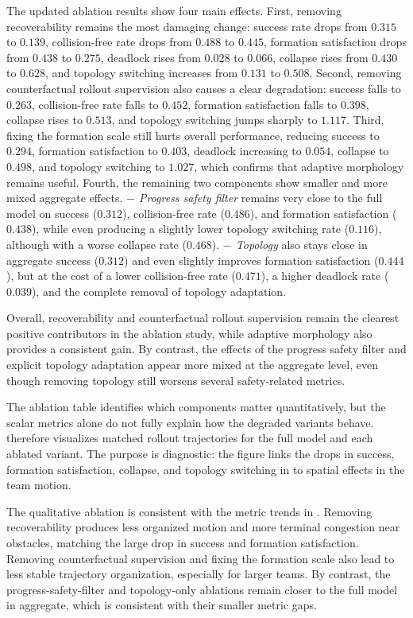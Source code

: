 \documentclass{ieeeaccess}
\begin{document}
The updated ablation results show four main effects. First, removing
recoverability remains the most damaging change: success rate drops from
$0.315$ to $0.139$, collision-free rate drops from $0.488$ to $0.445$,
formation satisfaction drops from $0.438$ to $0.275$, deadlock rises
from $0.028$ to $0.066$, collapse rises from $0.430$ to $0.628$, and
topology switching increases from $0.131$ to $0.508$. Second, removing
counterfactual rollout supervision also causes a clear degradation:
success falls to $0.263$, collision-free rate falls to $0.452$,
formation satisfaction falls to $0.398$, collapse rises to $0.513$, and
topology switching jumps sharply to $1.117$. Third, fixing the
formation scale still hurts overall performance, reducing success to
$0.294$, formation satisfaction to $0.403$, deadlock increasing to
$0.054$, collapse to $0.498$, and topology switching to $1.027$, which
confirms that adaptive morphology remains useful. Fourth, the remaining
two components show smaller and more mixed aggregate effects.
\emph{$-$ Progress safety filter} remains very close to the full model on
success ($0.312$), collision-free rate ($0.486$), and formation
satisfaction ($0.438$), while even producing a slightly lower topology
switching rate ($0.116$), although with a worse collapse rate
($0.468$). \emph{$-$ Topology} also stays close in aggregate success
($0.312$) and even slightly improves formation satisfaction ($0.444$),
but at the cost of a lower collision-free rate ($0.471$), a higher
deadlock rate ($0.039$), and the complete removal of topology
adaptation.

Overall, recoverability and counterfactual rollout supervision remain
the clearest positive contributors in the ablation study, while
adaptive morphology also provides a consistent gain. By contrast, the
effects of the progress safety filter and explicit topology adaptation appear
more mixed at the aggregate level, even though removing topology still
worsens several safety-related metrics.

The ablation table identifies which components matter quantitatively,
but the scalar metrics alone do not fully explain how the degraded
variants behave.  therefore visualizes
matched rollout trajectories for the full model and each ablated
variant. The purpose is diagnostic: the figure links the drops in
success, formation satisfaction, collapse, and topology switching in
 to spatial effects in the team motion.

The qualitative ablation is consistent with the metric trends in
. Removing recoverability produces less organized
motion and more terminal congestion near obstacles, matching the large
drop in success and formation satisfaction. Removing counterfactual
supervision and fixing the formation scale also lead to less stable
trajectory organization, especially for larger teams. By contrast, the
progress-safety-filter and topology-only ablations remain closer to the full
model in aggregate, which is consistent with their smaller metric gaps.
\end{document}
